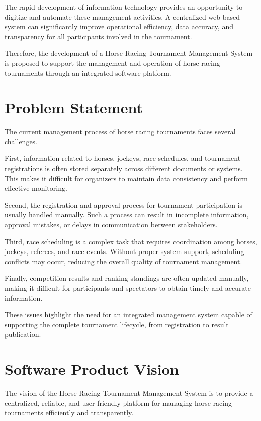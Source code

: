 The rapid development of information technology provides an opportunity to digitize and automate these management activities. A centralized web-based system can significantly improve operational efficiency, data accuracy, and transparency for all participants involved in the tournament.

Therefore, the development of a Horse Racing Tournament Management System is proposed to support the management and operation of horse racing tournaments through an integrated software platform.

\section{Problem Statement}

The current management process of horse racing tournaments faces several challenges.

First, information related to horses, jockeys, race schedules, and tournament registrations is often stored separately across different documents or systems. This makes it difficult for organizers to maintain data consistency and perform effective monitoring.

Second, the registration and approval process for tournament participation is usually handled manually. Such a process can result in incomplete information, approval mistakes, or delays in communication between stakeholders.

Third, race scheduling is a complex task that requires coordination among horses, jockeys, referees, and race events. Without proper system support, scheduling conflicts may occur, reducing the overall quality of tournament management.

Finally, competition results and ranking standings are often updated manually, making it difficult for participants and spectators to obtain timely and accurate information.

These issues highlight the need for an integrated management system capable of supporting the complete tournament lifecycle, from registration to result publication.

\section{Software Product Vision}

The vision of the Horse Racing Tournament Management System is to provide a centralized, reliable, and user-friendly platform for managing horse racing tournaments efficiently and transparently.

